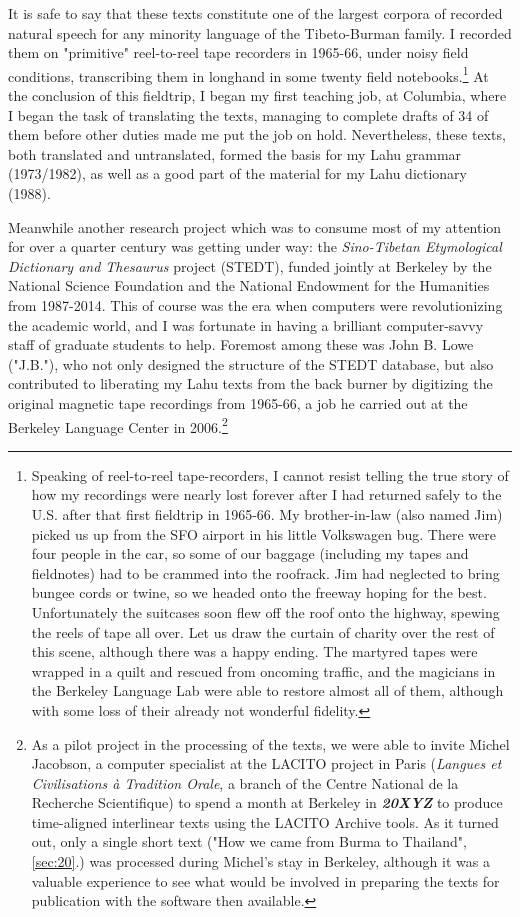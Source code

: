 It is safe to say that these texts constitute one of the largest corpora
of recorded natural speech for any minority language of the
Tibeto-Burman family. I recorded them on "primitive" reel-to-reel tape
recorders in 1965-66, under noisy field conditions, transcribing them in
longhand in some twenty field notebooks.\footnote{Speaking of
  reel-to-reel tape-recorders, I cannot resist telling the true story of
  how my recordings were nearly lost forever after I had returned safely
  to the U.S. after that first fieldtrip in 1965-66. My brother-in-law
  (also named Jim) picked us up from the SFO airport in his little
  Volkswagen bug. There were four people in the car, so some of our
  baggage (including my tapes and fieldnotes) had to be crammed into the
  roofrack. Jim had neglected to bring bungee cords or twine, so we
  headed onto the freeway hoping for the best. Unfortunately the
  suitcases soon flew off the roof onto the highway, spewing the reels
  of tape all over. Let us draw the curtain of charity over the rest of
  this scene, although there was a happy ending. The martyred tapes were
  wrapped in a quilt and rescued from oncoming traffic, and the
  magicians in the Berkeley Language Lab were able to restore almost all
  of them, although with some loss of their already not wonderful
  fidelity.} At the conclusion of this fieldtrip, I began my first
teaching job, at Columbia, where I began the task of translating the
texts, managing to complete drafts of 34 of them before other duties
made me put the job on hold. Nevertheless, these texts, both translated
and untranslated, formed the basis for my Lahu grammar (1973/1982), as
well as a good part of the material for my Lahu dictionary (1988).

Meanwhile another research project which was to consume most of my
attention for over a quarter century was getting under way: the
\emph{Sino-Tibetan Etymological Dictionary and Thesaurus} project
(STEDT), funded jointly at Berkeley by the National Science Foundation
and the National Endowment for the Humanities from 1987-2014. This of
course was the era when computers were revolutionizing the academic
world, and I was fortunate in having a brilliant computer-savvy staff
of graduate students to help. Foremost among these was John B. Lowe
("J.B."), who not only designed the structure of the STEDT database,
but also contributed to liberating my Lahu texts from the back burner
by digitizing the original magnetic tape recordings from 1965-66, a
job he carried out at the Berkeley Language Center in
2006.\footnote{As a pilot project in the processing of the texts, we
  were able to invite Michel Jacobson, a computer specialist at the
  LACITO project in Paris (\emph{Langues et Civilisations à Tradition
    Orale}, a branch of the Centre National de la Recherche
  Scientifique) to spend a month at Berkeley in \emph{\textbf{20XYZ}}
  to produce time-aligned interlinear texts using the LACITO Archive
  tools. As it turned out, only a single short text ("How we came from
  Burma to Thailand", \ref{sec:20}.) was processed during Michel's
  stay in Berkeley, although it was a valuable experience to see what
  would be involved in preparing the texts for publication with the
  software then available.}

